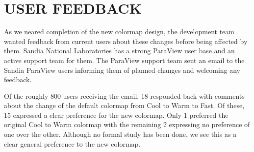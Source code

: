 \documentclass{IEEEcsmag}
\providecommand{\DIFaddtex}[1]{{\protect\color{blue}\uwave{#1}}} %
\providecommand{\DIFdeltex}[1]{{\protect\color{red}\sout{#1}}}                      %
\providecommand{\DIFaddbegin}{} %
\providecommand{\DIFaddend}{} %
\providecommand{\DIFdelbegin}{} %
\providecommand{\DIFdelend}{} %
\providecommand{\DIFadd}[1]{\texorpdfstring{\DIFaddtex{#1}}{#1}} %
\providecommand{\DIFdel}[1]{\texorpdfstring{\DIFdeltex{#1}}{}} %
\begin{document}
\DIFaddend \section{USER FEEDBACK}

\DIFdelbegin %



\DIFdelend As we neared completion of the new colormap design, the development team wanted feedback from current users about these changes before being affected by them.
Sandia National Laboratories has a strong ParaView user base and an active support team for them.
The ParaView support team sent an email to the Sandia ParaView users informing them of planned changes and welcoming any feedback.

Of the roughly 800 users receiving the email, 18 responded back with comments about the change of the default colormap from Cool to Warm to Fast.
Of these, 15 expressed a clear preference for the new colormap.
Only 1 preferred the original Cool to Warm colormap with the remaining 2 expressing no preference of one over the other.
Although no formal study has been done, we see this as a clear general preference \DIFdelbegin \DIFdel{to }\DIFdelend \DIFaddbegin \DIFadd{for }\DIFaddend the new colormap.
\end{document}
